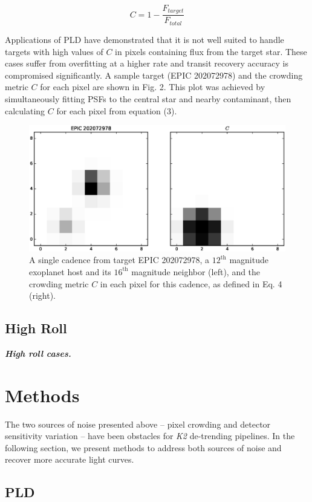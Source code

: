 \documentclass[12pt,preprint]{emulateapj}
\begin{document}
\[
\tag{4}
C = 1 - \frac{F_{target}}{F_{total}}
\]

Applications of PLD have demonstrated that it is not well suited to handle targets with high values of $C$ in pixels containing flux from the target star. These cases suffer from overfitting at a higher rate and transit recovery accuracy is compromised significantly. A sample target (EPIC 202072978) and the crowding metric $C$ for each pixel are shown in Fig. 2. This plot was achieved by simultaneously fitting PSFs to the central star and nearby contaminant, then calculating $C$ for each pixel from equation (3).

\begin{figure}[h]
	\centering
	\includegraphics[width=1.0\linewidth]{cr.eps}
	\caption{A single cadence from target EPIC 202072978, a $12^{\text{th}}$ magnitude exoplanet host and its $16^{\text{th}}$ magnitude neighbor (left), and the crowding metric $C$ in each pixel for this cadence, as defined in Eq. 4 (right).}
	\label{fig:crowding}
\end{figure}

\subsection{High Roll}

\textit{\textbf{High roll cases.}}

\section{Methods}

The two sources of noise presented above -- pixel crowding and detector sensitivity variation -- have been obstacles for \textit{K2} de-trending pipelines. In the following section, we present methods to address both sources of noise and recover more accurate light curves.

\subsection{PLD}
\end{document}
